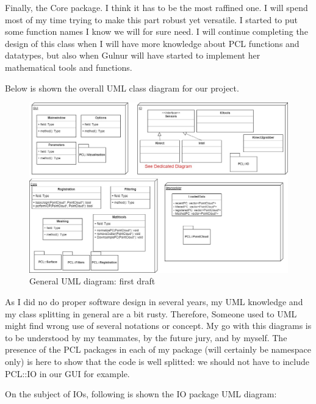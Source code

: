 \documentclass[aps,letterpaper,11pt]{revtex4}
\begin{document}
Finally, the Core package. I think it has to be the most raffined one. I will spend most of my time trying to make this part robust yet versatile. I started to put some function names I know we will for sure need. I will continue completing the design of this class when I will have more knowledge about PCL functions and datatypes, but also when Gulnur will have started to implement her mathematical tools and functions.

Below is shown the overall UML class diagram for our project.

\begin{figure}[H]
	\centering
	\includegraphics[width=15cm]{GeneralUML.jpg}
	\caption{General UML diagram: first draft}
	\label{fig: GeneralUML}    
\end{figure}

As I did no do proper software design in several years, my UML knowledge and my class splitting in general are a bit rusty. Therefore, Someone used to UML might find wrong use of several notations or concept. My go with this diagrams is to be understood by my teammates, by the future jury, and by myself. 
The presence of the PCL packages in each of my package (will certainly be namespace only) is here to show that the code is well splitted: we should not have to include PCL::IO in our GUI for example.

On the subject of IOs, following is shown the IO package UML diagram: 
\end{document}
